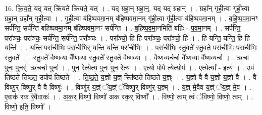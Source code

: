 \documentclass[17pt]{extarticle}
\begin{document}
16. क्रि॒य॒ते॒ यद् यत् क्रि॑यते क्रियते॒ यत् । . यद् ग्रहा॒न् ग्रहा॒न्॒. यद् यद् ग्रहान्॑ । . ग्रहा᳚न् गृही॒त्वा गृ॑ही॒त्वा ग्रहा॒न् ग्रहा᳚न् गृही॒त्वा । . गृ॒ही॒त्वा ब॑हिष्पवमा॒नम् ब॑हिष्पवमा॒नम् गृ॑ही॒त्वा गृ॑ही॒त्वा ब॑हिष्पवमा॒नम् । . ब॒हि॒ष्प॒व॒मा॒नꣳ सर्प॑न्ति॒ सर्प॑न्ति बहिष्पवमा॒नम् ब॑हिष्पवमा॒नꣳ सर्प॑न्ति । . ब॒हि॒ष्प॒व॒मा॒नमिति॑ बहिः - प॒व॒मा॒नम् । . सर्प॑न्ति॒ परा᳚ञ्चः॒ परा᳚ञ्चः॒ सर्प॑न्ति॒ सर्प॑न्ति॒ परा᳚ञ्चः । . परा᳚ञ्चो॒ हि हि परा᳚ञ्चः॒ परा᳚ञ्चो॒ हि । . हि यन्ति॒ यन्ति॒ हि हि यन्ति॑ । . यन्ति॒ परा॑चीभिः॒ परा॑चीभि॒र् यन्ति॒ यन्ति॒ परा॑चीभिः । . परा॑चीभिः स्तु॒वते᳚ स्तु॒वते॒ परा॑चीभिः॒ परा॑चीभिः स्तु॒वते᳚ । . स्तु॒वते॑ वैष्ण॒व्या वै᳚ष्ण॒व्या स्तु॒वते᳚ स्तु॒वते॑ वैष्ण॒व्या । . वै॒ष्ण॒व्यर्चर्चा वै᳚ष्ण॒व्या वै᳚ष्ण॒व्यर्चा । . ऋ॒चा पुनः॒ पुनर्॑. ऋ॒चर्चा पुनः॑ । . पुन॒ रेत्येत्य॒ पुनः॒ पुन॒ रेत्य॑ । . एत्यो पोपे त्येत्योप॑ । . एत्येत्या᳚ - इत्य॑ । . उप॑ तिष्ठते तिष्ठत॒ उपोप॑ तिष्ठते । . ति॒ष्ठ॒ते॒ य॒ज्ञो य॒ज्ञ् स्ति॑ष्ठते तिष्ठते य॒ज्ञ्ः । . य॒ज्ञो वै वै य॒ज्ञो य॒ज्ञो वै । . वै विष्णु॒र् विष्णु॒र् वै वै विष्णुः॑ । . विष्णु॑र् य॒ज्ञ्ं ॅय॒ज्ञ्ं ॅविष्णु॒र् विष्णु॑र् य॒ज्ञ्म् । . य॒ज्ञ् मे॒वैव य॒ज्ञ्ं ॅय॒ज्ञ् मे॒व । . ए॒वाक॑ रक रे॒वैवाकः॑ । . अ॒क॒र् विष्णो॒ विष्णो॑ अक रक॒र् विष्णो᳚ । . विष्णो॒ त्वम् त्वं ॅविष्णो॒ विष्णो॒ त्वम् । . विष्णो॒ इति॒ विष्णो᳚ । \newline
\end{document}
